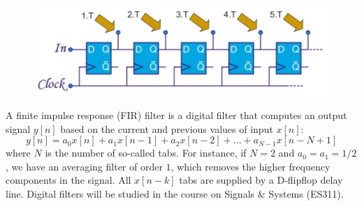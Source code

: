 \begin{figure}[h!]
	\centering
	\includegraphics[width=14cm]{figures/ch17/D_FF5.jpg}
	\caption{}
	\label{fig:D_FF5}
\end{figure}

A finite impulse response (FIR) filter is a digital filter that computes an output signal $y[n]$ based on the current and previous values of input $x[n]$:
$$ y[n] = a_0 x[n] + a_1 x[n-1] + a_2  x[n-2] + \ldots + a_{N-1} x[n-N+1]$$
where $N$ is the number of so-called tabs. For instance, if $N = 2$ and $a_0 = a_1 = 1/2$, we have an averaging filter of order $1$, which removes the higher frequency components in the signal. All $x[n-k]$ tabs are supplied by a D-flipflop delay line. Digital filters will be studied in the course on Signals \& Systems (ES311).

